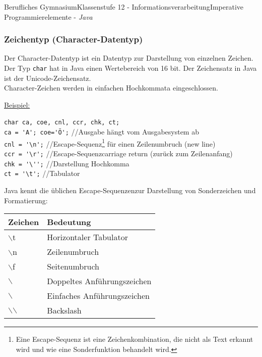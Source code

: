 \documentclass[oneside,openany,headings=optiontotoc,11pt,numbers=noenddot]{article}
\begin{document}
\begin{worksheet}{Berufliches Gymnasium}{Klassenstufe 12 - Informationsverarbeitung}{Imperative Programmierelemente - \textit{Java}}
		\subsubsection{Zeichentyp (Character-Datentyp)}
		Der Character-Datentyp ist ein Datentyp zur Darstellung von einzelnen Zeichen. Der Typ \lstinline[style=JavaInputStyle]|char| hat in Java einen Wertebereich von 16 bit. Der Zeichensatz in Java ist der Unicode-Zeichensatz.\\
		Character-Zeichen werden in einfachen Hochkommata eingeschlossen.\\
		\par\noindent
		\underline{Beispiel:}		
		\begin{tabbing}
			\lstinline[style=JavaInputStyle]|char ca, coe, cnl, ccr, chk, ct;| ~~ \= \\
			\lstinline[style=JavaInputStyle]|ca = 'A'; coe='Ö';| \> //Ausgabe hängt vom Ausgabesystem ab\\
			\lstinline[style=JavaInputStyle]|cnl = '\n';| \> //Escape-Sequenz\footnote{Eine Escape-Sequenz ist eine Zeichenkombination, die nicht als Text erkannt wird und wie eine Sonderfunktion behandelt wird.\label{fn:esc}} für einen Zeilenumbruch (new line)\\
			\lstinline[style=JavaInputStyle]|ccr = '\r';| \> //Escape-Sequenz\footnotemark[1] carriage return (zurück zum Zeilenanfang)\\
			\lstinline[style=JavaInputStyle]|chk = '\'';| \> //Darstellung Hochkomma\\
			\lstinline[style=JavaInputStyle]|ct = '\t';| \> //Tabulator
		\end{tabbing}
		Java kennt die \grqq{}üblichen\grqq{} Escape-Sequenzen\footnotemark[1] zur Darstellung von Sonderzeichen und Formatierung:\\
		\par\noindent
		\begin{tabularx}{\textwidth}{|X|X|}
			\hline
			\textbf{Zeichen} & \textbf{Bedeutung}\\
			\hline
			\hline
			$\backslash$t & Horizontaler Tabulator\\
			\hline
			$\backslash$n & Zeilenumbruch\\
			\hline
			$\backslash$f & Seitenumbruch\\
			\hline
			$\backslash$\grqq{} & Doppeltes Anführungszeichen\\
			\hline
			$\backslash$\grq{} & Einfaches Anführungszeichen\\
			\hline
			$\backslash$$\backslash$ & Backslash\\
			\hline
		\end{tabularx}

\end{worksheet}
\end{document}
